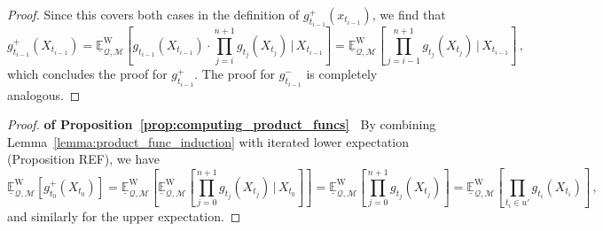 \documentclass[twoside,11pt]{article}
\newcommand{\lexp}{\underline{\mathbb{E}}_{\rateset,\mathcal{M}}^\mathrm{W}}
\newcommand{\rateset}{\mathcal{Q}}
\begin{document}
\begin{proof}
Since this covers both cases in the definition of $g_{t_{i-1}}^+(x_{t_{i-1}})$, we find that
\begin{equation*}
g_{t_{i-1}}^+(X_{t_{i-1}}) = \lexp\left[g_{t_{i-1}}(X_{t_{i-1}})\cdot\prod_{j=i}^{n+1}g_{t_j}(X_{t_j})\,\vert\,X_{t_{i-1}}\right] = \lexp\left[\prod_{j={i-1}}^{n+1}g_{t_j}(X_{t_j})\,\vert\,X_{t_{i-1}}\right]\,,
\end{equation*}
which concludes the proof for $g_{t_{i-1}}^+$. The proof for $g_{t_{i-1}}^-$ is completely analogous.
\end{proof}

\begin{proof}{\bf of Proposition~\ref{prop:computing_product_funcs}~}
By combining Lemma~\ref{lemma:product_func_induction} with iterated lower expectation (Proposition REF), we have
\begin{equation*}
\lexp\left[g_{t_0}^+(X_{t_0})\right] = \lexp\left[\lexp\left[\prod_{j=0}^{n+1}g_{t_j}(X_{t_j})\,\vert\,X_{t_0}\right]\right] = \lexp\left[\prod_{j=0}^{n+1}g_{t_j}(X_{t_j})\right] = \lexp\left[\prod_{t_i\in u'}g_{t_i}(X_{t_i})\right]\,,
\end{equation*}
and similarly for the upper expectation.
\end{proof}
\end{document}
